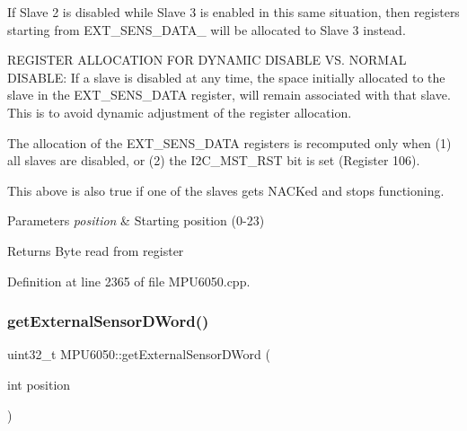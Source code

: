 If Slave 2 is disabled while Slave 3 is enabled in this same situation, then registers starting from E\+X\+T\+\_\+\+S\+E\+N\+S\+\_\+\+D\+A\+T\+A\+\_ will be allocated to Slave 3 instead.

R\+E\+G\+I\+S\+T\+ER A\+L\+L\+O\+C\+A\+T\+I\+ON F\+OR D\+Y\+N\+A\+M\+IC D\+I\+S\+A\+B\+LE VS. N\+O\+R\+M\+AL D\+I\+S\+A\+B\+LE\+: If a slave is disabled at any time, the space initially allocated to the slave in the E\+X\+T\+\_\+\+S\+E\+N\+S\+\_\+\+D\+A\+TA register, will remain associated with that slave. This is to avoid dynamic adjustment of the register allocation.

The allocation of the E\+X\+T\+\_\+\+S\+E\+N\+S\+\_\+\+D\+A\+TA registers is recomputed only when (1) all slaves are disabled, or (2) the I2\+C\+\_\+\+M\+S\+T\+\_\+\+R\+ST bit is set (Register 106).

This above is also true if one of the slaves gets N\+A\+C\+Ked and stops functioning.


\begin{DoxyParams}{Parameters}
{\em position} & Starting position (0-\/23) \\
\hline
\end{DoxyParams}
\begin{DoxyReturn}{Returns}
Byte read from register 
\end{DoxyReturn}


Definition at line 2365 of file M\+P\+U6050.\+cpp.


\begin{DoxyCode}{0}

\end{DoxyCode}
\mbox{\label{classMPU6050_afd8983f0911e37015434bebc85185fb2}} 
\subsubsection{\texorpdfstring{getExternalSensorDWord()}{getExternalSensorDWord()}}
{\footnotesize\ttfamily uint32\+\_\+t M\+P\+U6050\+::get\+External\+Sensor\+D\+Word (\begin{DoxyParamCaption}\item[{int}]{position }\end{DoxyParamCaption})}

